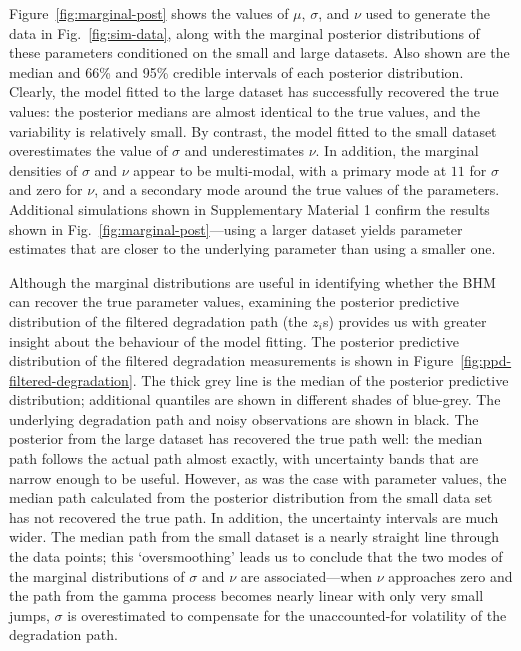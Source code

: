\documentclass{article}
\begin{document}
Figure~\ref{fig:marginal-post} shows the values of $\mu$, $\sigma$, and $\nu$ used to generate the data in Fig.~\ref{fig:sim-data}, along with the marginal posterior distributions of these parameters conditioned on the small and large datasets. Also shown are the median and 66\% and 95\% credible intervals of each posterior distribution. Clearly, the model fitted to the large dataset has successfully recovered the true values: the posterior medians are almost identical to the true values, and the variability is relatively small. By contrast, the model fitted to the small dataset overestimates the value of $\sigma$ and underestimates $\nu$. In addition, the marginal densities of $\sigma$ and $\nu$ appear to be multi-modal, with a primary mode at $11$ for $\sigma$ and zero for $\nu$, and a secondary mode around the true values of the parameters. Additional simulations shown in Supplementary Material 1 confirm the results shown in Fig.~\ref{fig:marginal-post}---using a larger dataset yields parameter estimates that are closer to the underlying parameter than using a smaller one. 

Although the marginal distributions are useful in identifying whether the BHM can recover the true parameter values, examining the posterior predictive distribution of the filtered degradation path (the $z_i$s) provides us with greater insight about the behaviour of the model fitting. The posterior predictive distribution of the filtered degradation measurements is shown in Figure~\ref{fig:ppd-filtered-degradation}. The thick grey line is the median of the posterior predictive distribution; additional quantiles are shown in different shades of blue-grey. The underlying degradation path and noisy observations are shown in black. The posterior from the large dataset has recovered the true path well: the median path follows the actual path almost exactly, with uncertainty bands that are narrow enough to be useful. However, as was the case with parameter values, the median path calculated from the posterior distribution from the small data set has not recovered the true path. In addition, the uncertainty intervals are much wider. The median path from the small dataset is a nearly straight line through the data points; this `oversmoothing' leads us to conclude that the two modes of the marginal distributions of  $\sigma$ and $\nu$ are associated---when $\nu$ approaches zero and the path from the gamma process becomes nearly linear with only very small jumps, $\sigma$ is overestimated to compensate for the unaccounted-for volatility of the degradation path.
\end{document}
